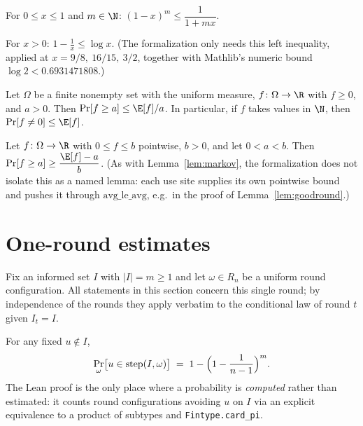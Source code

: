 \begin{lemma}\label{lem:upper}
  \leanok
  For $0 \le x \le 1$ and $m \in \N$: $(1-x)^m \le \dfrac{1}{1+mx}$.
\end{lemma}

\begin{lemma}\label{lem:logbounds}
  \leanok
  For $x > 0$: $1 - \tfrac1x \le \log x$. (The formalization only needs this
  left inequality, applied at $x = 9/8,\ 16/15,\ 3/2$, together with
  Mathlib's numeric bound $\log 2 < 0.6931471808$.)
\end{lemma}

\begin{lemma}\label{lem:markov}
  \leanok
  Let $\Omega$ be a finite nonempty set with the uniform measure,
  $f \colon \Omega \to \R$ with $f \ge 0$, and $a > 0$. Then
  $\Pr[f \ge a] \le \E[f]/a$. In particular, if $f$ takes values in $\N$,
  then $\Pr[f \ne 0] \le \E[f]$.
\end{lemma}

\begin{lemma}\label{lem:revmarkov}
  \leanok
  Let $f \colon \Omega \to \R$ with $0 \le f \le b$ pointwise, $b > 0$, and
  let $0 < a < b$. Then $\Pr[f \ge a] \ge \dfrac{\E[f] - a}{b}$. (As with
  Lemma~\ref{lem:markov}, the formalization does not isolate this as a
  named lemma: each use site supplies its own pointwise bound and pushes it
  through $\mathrm{avg\_le\_avg}$, e.g.\ in the proof of
  Lemma~\ref{lem:goodround}.)
\end{lemma}

\section{One-round estimates}\label{sec:oneround}

Fix an informed set $I$ with $|I| = m \ge 1$ and let $\omega \in R_n$ be a
uniform round configuration. All statements in this section concern this
single round; by independence of the rounds they apply verbatim to the
conditional law of round $t$ given $I_t = I$.

\begin{lemma}\label{lem:contact}
  \leanok
  For any fixed $u \notin I$,
  \[
    \Pr_\omega\bigl[u \in \mathrm{step}(I,\omega)\bigr]
    \;=\; 1 - \Bigl(1-\frac{1}{n-1}\Bigr)^{m}.
  \]
  The Lean proof is the only place where a probability is \emph{computed}
  rather than estimated: it counts round configurations avoiding $u$ on $I$
  via an explicit equivalence to a product of subtypes and
  \texttt{Fintype.card\_pi}.
\end{lemma}

